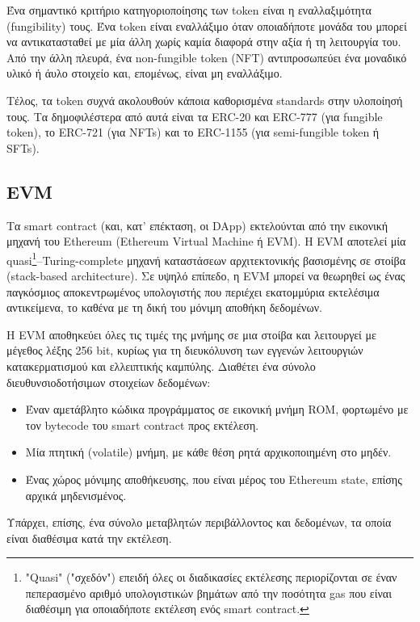 Ένα σημαντικό κριτήριο κατηγοριοποίησης των token είναι η εναλλαξιμότητα (fungibility) τους. Ένα token είναι εναλλάξιμο όταν οποιαδήποτε μονάδα του μπορεί να αντικατασταθεί με μία άλλη χωρίς καμία διαφορά στην αξία ή τη λειτουργία του. Από την άλλη πλευρά, ένα non-fungible token (NFT) αντιπροσωπεύει ένα μοναδικό υλικό ή άυλο στοιχείο και, επομένως, είναι μη εναλλάξιμο.

Τέλος, τα token συχνά ακολουθούν κάποια καθορισμένα standards στην υλοποίησή τους. Τα δημοφιλέστερα από αυτά είναι τα ERC-20 και ERC-777 (για fungible token), το ERC-721 (για NFTs) και το ERC-1155 (για semi-fungible token ή SFTs).

\subsection{EVM} \label{subsection:2-6-5-evm}
Τα smart contract (και, κατ' επέκταση, οι DApp) εκτελούνται από την εικονική μηχανή του Ethereum (Ethereum Virtual Machine ή EVM). Η EVM αποτελεί μία quasi\footnote{"Quasi" ("σχεδόν") επειδή όλες οι διαδικασίες εκτέλεσης περιορίζονται σε έναν πεπερασμένο αριθμό υπολογιστικών βημάτων από την ποσότητα gas που είναι διαθέσιμη για οποιαδήποτε εκτέλεση ενός smart contract.}–Turing-complete μηχανή καταστάσεων αρχιτεκτονικής βασισμένης σε στοίβα (stack-based architecture). Σε υψηλό επίπεδο, η EVM μπορεί να θεωρηθεί ως ένας παγκόσμιος αποκεντρωμένος υπολογιστής που περιέχει εκατομμύρια εκτελέσιμα αντικείμενα, το καθένα με τη δική του μόνιμη αποθήκη δεδομένων.

Η EVM αποθηκεύει όλες τις τιμές της μνήμης σε μια στοίβα και λειτουργεί με μέγεθος λέξης 256 bit, κυρίως για τη διευκόλυνση των εγγενών λειτουργιών κατακερματισμού και ελλειπτικής καμπύλης. Διαθέτει ένα σύνολο διευθυνσιοδοτήσιμων στοιχείων δεδομένων:

\begin{itemize}
	\item Έναν αμετάβλητο κώδικα προγράμματος σε εικονική μνήμη ROM, φορτωμένο με τον \textenglish{bytecode} του smart contract προς εκτέλεση.
	\item Μία πτητική (volatile) μνήμη, με κάθε θέση ρητά αρχικοποιημένη στο μηδέν.
	\item Ένας χώρος μόνιμης αποθήκευσης, που είναι μέρος του Ethereum state, επίσης αρχικά μηδενισμένος.
\end{itemize}

Υπάρχει, επίσης, ένα σύνολο μεταβλητών περιβάλλοντος και δεδομένων, τα οποία είναι διαθέσιμα κατά την εκτέλεση.\cite{2.6-ethereum-mastering}

